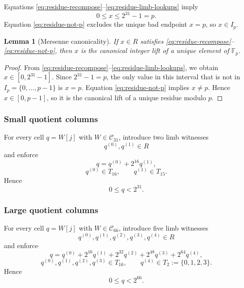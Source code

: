 ﻿\documentclass[11pt]{article}
\newtheorem{lemma}[theorem]{Lemma}
\newcommand{\Fp}{\mathbb{F}_p}
\newcommand{\Cset}{\mathcal{C}}
\begin{document}
Equations \eqref{eq:residue-recompose}--\eqref{eq:residue-limb-lookups} imply
\[
0 \le x \le 2^{31}-1 = p.
\]
Equation \eqref{eq:residue-not-p} excludes the unique bad endpoint \(x=p\), so \(x\in I_p\).

\begin{lemma}[Mersenne canonicality]
\label{lem:mersenne-canonicality}
If \(x\in R\) satisfies \eqref{eq:residue-recompose}--\eqref{eq:residue-not-p}, then \(x\) is the canonical integer lift of a unique element of \(\Fp\).
\end{lemma}

\begin{proof}
From \eqref{eq:residue-recompose}--\eqref{eq:residue-limb-lookups}, we obtain \(x\in[0,2^{31}-1]\). Since \(2^{31}-1=p\), the only value in this interval that is not in \(I_p=\{0,\dots,p-1\}\) is \(x=p\). Equation \eqref{eq:residue-not-p} implies \(x\neq p\). Hence \(x\in[0,p-1]\), so it is the canonical lift of a unique residue modulo \(p\).
\end{proof}

\subsubsection{Small quotient columns}

For every cell \(q=W[j]\) with \(W\in\Cset_{31}\), introduce two limb witnesses
\[
q^{(0)},q^{(1)}\in R
\]
and enforce
\begin{equation}
q = q^{(0)} + 2^{16}q^{(1)},
\label{eq:q31-recompose}
\end{equation}
\begin{equation}
q^{(0)} \in T_{16},
\qquad
q^{(1)} \in T_{15}.
\label{eq:q31-lookups}
\end{equation}
Hence
\[
0 \le q < 2^{31}.
\]

\subsubsection{Large quotient columns}

For every cell \(q=W[j]\) with \(W\in\Cset_{66}\), introduce five limb witnesses
\[
q^{(0)},q^{(1)},q^{(2)},q^{(3)},q^{(4)} \in R
\]
and enforce
\begin{equation}
q = q^{(0)} + 2^{16}q^{(1)} + 2^{32}q^{(2)} + 2^{48}q^{(3)} + 2^{64}q^{(4)},
\label{eq:q66-recompose}
\end{equation}
\begin{equation}
q^{(0)},q^{(1)},q^{(2)},q^{(3)} \in T_{16},
\qquad
q^{(4)} \in T_{2} := \{0,1,2,3\}.
\label{eq:q66-lookups}
\end{equation}
Hence
\[
0 \le q < 2^{66}.
\]
\end{document}
